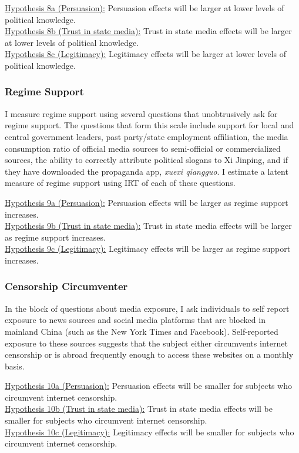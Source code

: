 \documentclass[11pt]{article}
\begin{document}
\noindent\underline{Hypothesis 8a  (Persuasion):} Persuasion effects will be larger at lower levels of political knowledge.\\
\noindent\underline{Hypothesis 8b  (Trust in state media):} Trust in state media effects will be larger at lower levels of political knowledge.\\
\noindent\underline{Hypothesis 8c  (Legitimacy):} Legitimacy effects will be larger at lower levels of political knowledge.

\subsubsection{Regime Support}

I measure regime support using several questions that unobtrusively ask for regime support. The questions that form this scale include support for local and central government leaders, past party/state employment affiliation, the media consumption ratio of official media sources to semi-official or commercialized sources, the ability to correctly attribute political slogans to Xi Jinping, and if they have downloaded the propaganda app, {\it xuexi qiangguo}. I estimate a latent measure of regime support using IRT of each of these questions.\newline

\noindent\underline{Hypothesis 9a  (Persuasion):} Persuasion effects will be larger as regime support increases.\\
\noindent\underline{Hypothesis 9b  (Trust in state media):} Trust in state media effects will be larger as regime support increases.\\
\noindent\underline{Hypothesis 9c  (Legitimacy):} Legitimacy effects will be larger as regime support increases.

\subsubsection{Censorship Circumventer}

In the block of questions about media exposure, I ask individuals to self report exposure to news sources and social media platforms that are blocked in mainland China (such as the New York Times and Facebook). Self-reported exposure to these sources suggests that the subject either circumvents internet censorship or is abroad frequently enough to access these websites on a monthly basis.\newline

\noindent\underline{Hypothesis 10a  (Persuasion):} Persuasion effects will be smaller for subjects who circumvent internet censorship.\\
\noindent\underline{Hypothesis 10b  (Trust in state media):} Trust in state media effects will be smaller for subjects who circumvent internet censorship.\\
\noindent\underline{Hypothesis 10c  (Legitimacy):} Legitimacy effects will be smaller for subjects who circumvent internet censorship.
\end{document}
